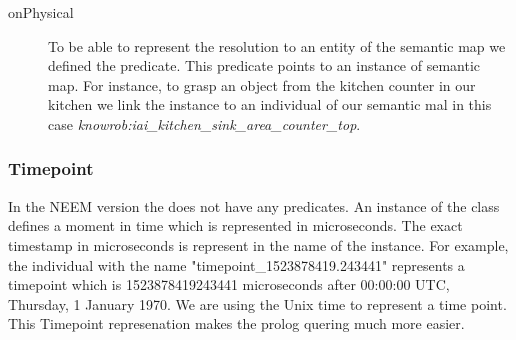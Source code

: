 	\begin{description}
		\item[onPhysical] 
			To be able to represent the resolution to an entity of the semantic map we defined the  predicate.
			This predicate points to an instance of semantic map.
			For instance, to grasp an object from the kitchen counter in our kitchen we link the  instance to an individual of our semantic mal in this case \textit{knowrob:iai\_kitchen\_sink\_area\_counter\_top}.
	\end{description}

\subsubsection{Timepoint}
	In the NEEM version \neemversion the  does not have any predicates.
	An instance of the  class defines a moment in time which is represented in microseconds.
	The exact timestamp in microseconds is represent in the name of the instance.
	For example, the individual with the name "timepoint\_1523878419.243441" represents a timepoint which is 1523878419243441 microseconds after 00:00:00 UTC, Thursday, 1 January 1970.
	We are using the Unix time to represent a time point\cite{matthew2011beginning}.
	This Timepoint represenation makes the prolog quering much more easier.